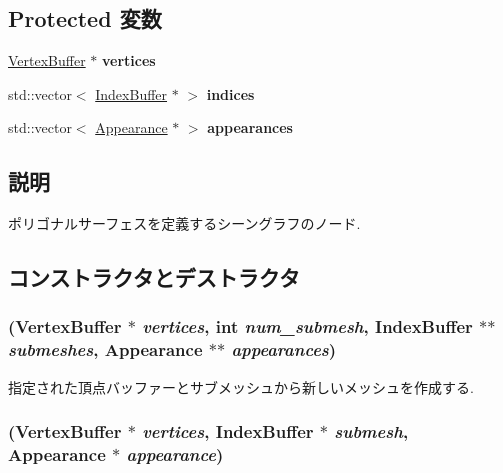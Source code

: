 \subsection*{Protected 変数}
\begin{CompactItemize}
\item 
\hypertarget{classm3g_1_1Mesh_1a2db0a8bc6986ba148b6b6f5dee271f}{
\hyperlink{classm3g_1_1VertexBuffer}{VertexBuffer} $\ast$ \textbf{vertices}}
\label{classm3g_1_1Mesh_1a2db0a8bc6986ba148b6b6f5dee271f}

\item 
\hypertarget{classm3g_1_1Mesh_7280e670882c2ce658bd600655fb477e}{
std::vector$<$ \hyperlink{classm3g_1_1IndexBuffer}{IndexBuffer} $\ast$ $>$ \textbf{indices}}
\label{classm3g_1_1Mesh_7280e670882c2ce658bd600655fb477e}

\item 
\hypertarget{classm3g_1_1Mesh_6dcb9adb660a04b601286a3ce4500fba}{
std::vector$<$ \hyperlink{classm3g_1_1Appearance}{Appearance} $\ast$ $>$ \textbf{appearances}}
\label{classm3g_1_1Mesh_6dcb9adb660a04b601286a3ce4500fba}

\end{CompactItemize}


\subsection{説明}
ポリゴナルサーフェスを定義するシーングラフのノード. 

\subsection{コンストラクタとデストラクタ}
\hypertarget{classm3g_1_1Mesh_f2c80c243fdcd32b07c77d2ab3d565ab}{
\subsubsection[{Mesh}]{ ({\bf VertexBuffer} $\ast$ {\em vertices}, \/  int {\em num\_\-submesh}, \/  {\bf IndexBuffer} $\ast$$\ast$ {\em submeshes}, \/  {\bf Appearance} $\ast$$\ast$ {\em appearances})}}
\label{classm3g_1_1Mesh_f2c80c243fdcd32b07c77d2ab3d565ab}


指定された頂点バッファーとサブメッシュから新しいメッシュを作成する. \hypertarget{classm3g_1_1Mesh_2d7766ebbb63eccd77d0dd8b53b400a3}{
\subsubsection[{Mesh}]{ ({\bf VertexBuffer} $\ast$ {\em vertices}, \/  {\bf IndexBuffer} $\ast$ {\em submesh}, \/  {\bf Appearance} $\ast$ {\em appearance})}}
\label{classm3g_1_1Mesh_2d7766ebbb63eccd77d0dd8b53b400a3}


